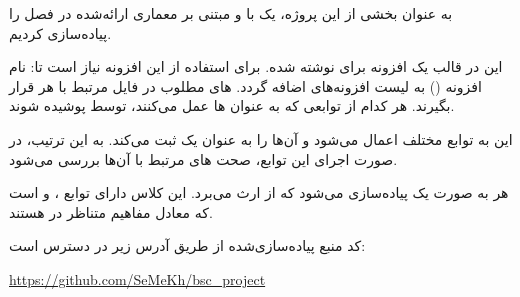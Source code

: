 به عنوان بخشی از این پروژه، یک   با  و مبتنی بر معماری ارائه‌شده در فصل  را پیاده‌سازی کردیم.


این  در قالب یک افزونه برای  نوشته شده. برای استفاده از این افزونه نیاز است تا:
 نام افزونه () به لیست افزونه‌های  اضافه گردد.
 ‌های مطلوب در فایل  مرتبط با هر   قرار بگیرند.
 هر کدام از توابعی که به عنوان  ‌ها عمل می‌کنند، توسط   پوشیده شوند.


این  به توابع مختلف اعمال می‌شود و آن‌ها را به عنوان یک   ثبت می‌کند. به این ترتیب، در صورت اجرای این توابع، صحت ‌های مرتبط با آن‌ها بررسی می‌شود.

هر  به صورت یک  پیاده‌سازی می‌شود که از  ارث می‌برد. این کلاس دارای توابع ،  و  است که معادل مفاهیم متناظر در  هستند.

کد منبع  پیاده‌سازی‌شده از طریق آدرس زیر در دسترس است:

\begin{center}
\url{https://github.com/SeMeKh/bsc_project}
\end{center}
